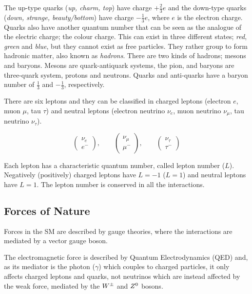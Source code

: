 			\noindent The up-type quarks (\textit{up, charm, top}) have charge $+\frac{2}{3}e$ and the down-type quarks (\textit{down, strange, beauty/bottom}) have charge $-\frac{1}{3}e$, where $e$ is the electron charge. Quarks also have another quantum number that can be seen as the analogue of the electric charge; the colour charge. This can exist in three different states; \textit{red}, \textit{green} and \textit{blue}, but they cannot exist as free particles. They rather group to form hadronic matter, also known as \emph{hadrons}. There are two kinds of hadrons; mesons and baryons. Mesons are quark-antiquark systems, \eg the pion, and baryons are three-quark system, \eg protons and neutrons. Quarks and anti-quarks have a baryon number of $\frac{1}{3}$ and $-\frac{1}{3}$, respectively.

			There are six leptons and they can be classified in charged leptons (electron $e$, muon $\mu$, tau $\tau$) and neutral leptons (electron neutrino $\nu_e$, muon neutrino $\nu_{\mu}$, tau neutrino $\nu_{\tau}$).
			
			\begin{equation*}
			\label{eq:lepton_flavor_doublets}
				\begin{pmatrix} \nu_e      \\ e^-    \end{pmatrix}, \qquad
				\begin{pmatrix} \nu_{\mu}  \\ \mu^-  \end{pmatrix}, \qquad
				\begin{pmatrix} \nu_{\tau} \\ \tau^- \end{pmatrix}
			\end{equation*}

			Each lepton has a characteristic quantum number, called lepton number ($L$). Negatively (positively) charged leptons have $L=-1$ ($L=1$) and neutral leptons have $L=1$. The lepton number is conserved in all the interactions. 



		\subsection*{Forces of Nature}

			Forces in the SM are described by gauge theories, where the interactions are mediated by a vector gauge boson. 

			The electromagnetic force is described by Quantum Electrodynamics (QED) and, as its mediator is the photon ($\gamma$) which couples to charged particles, it only affects charged leptons and quarks, not neutrinos which are instead affected by the weak force, mediated by the $W^{\pm}$ and $Z^0$ bosons. 

